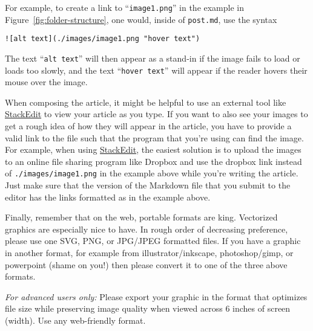 \documentclass[paper=a4, fontsize=11pt]{scrartcl}
\numberwithin{equation}{section}        %
\numberwithin{figure}{section}            %
\numberwithin{table}{section}                %
\begin{document}
For example, to create a link to ``\texttt{image1.png}'' in the example in
Figure~\ref{fig:folder-structure}, one would, inside of \texttt{post.md}, use
the syntax

\begin{verbatim}![alt text](./images/image1.png "hover text")\end{verbatim}

The text ``\texttt{alt text}'' will then appear as a stand-in if the image fails to
load or loads too slowly, and the text ``\texttt{hover text}'' will appear if the
reader hovers their mouse over the image.

When composing the article, it might be helpful to use an external tool like
\href{https://stackedit.io/editor}{StackEdit} to view your article as you type.
If you want to also see your images to get a rough idea of how they will appear
in the article, you have to provide a valid link to the file such that the
program that you're using can find the image. For example, when using
\href{https://stackedit.io/editor}{StackEdit}, the easiest solution is to upload
the images to an online file sharing program like Dropbox and use the dropbox
link instead of \texttt{./images/image1.png} in the example above while you're
writing the article. Just make sure that the version of the Markdown file that you
submit to the editor has the links formatted as in the example above.

Finally, remember that on the web, portable formats are king. Vectorized graphics are
especially nice to have. In rough order of decreasing preference, please use one
SVG, PNG, or JPG/JPEG formatted files. If you have a graphic in another format,
for example from illustrator/inkscape, photoshop/gimp, or powerpoint (shame on
you!) then please convert it to one of the three above formats.

\emph{For advanced users only:} Please
export your graphic in the format that optimizes file size while preserving image quality
when viewed across 6 inches of screen (width). Use any web-friendly format.
\end{document}
